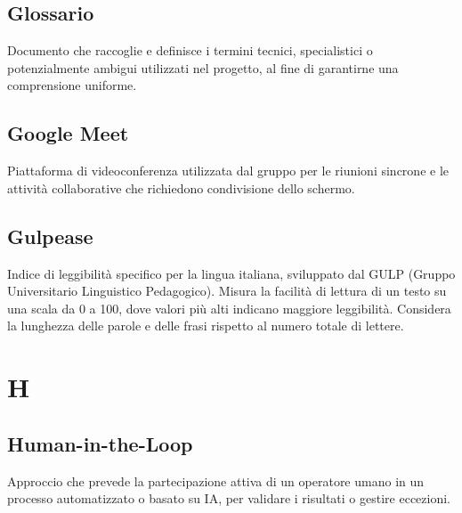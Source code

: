 \documentclass[a4paper, 11pt, oneside]{scrartcl} %
\begin{document}
\vspace{0.5cm}

\subsection*{Glossario}


Documento che raccoglie e definisce i termini tecnici, specialistici o potenzialmente ambigui utilizzati nel progetto, al fine di garantirne una comprensione uniforme.

\vspace{0.5cm}

\subsection*{Google Meet}


Piattaforma di videoconferenza utilizzata dal gruppo per le riunioni sincrone e le attività collaborative che richiedono condivisione dello schermo.

\vspace{0.5cm}

\subsection*{Gulpease}
Indice di leggibilità specifico per la lingua italiana, sviluppato dal GULP (Gruppo Universitario Linguistico Pedagogico). Misura la facilità di lettura di un testo su una scala da 0 a 100, dove valori più alti indicano maggiore leggibilità. Considera la lunghezza delle parole e delle frasi rispetto al numero totale di lettere.
\vspace{0.5cm}

\section*{H}

\subsection*{Human-in-the-Loop}
Approccio che prevede la partecipazione attiva di un operatore umano in un processo automatizzato o basato su IA, per validare i risultati o gestire eccezioni.
\vspace{0.5cm}
\end{document}
